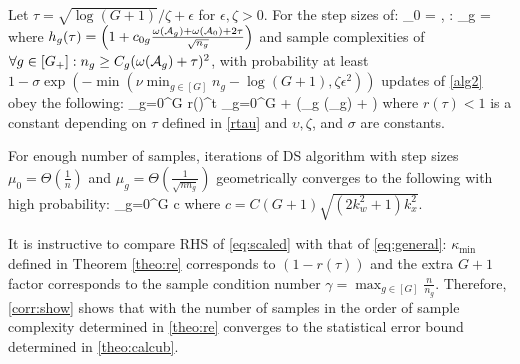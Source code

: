 \begin{theorem}
	\label{theo:step}		
	Let $\tau = \sqrt{\log(G+1)}/\zeta + \epsilon$ for $\epsilon, \zeta > 0$. For the step sizes of:
	\be
	\nr
	\mu_0 =  ,
	\forall \in [G]: \mu_g =   
	\ee
	where $h_g(\tau) = \left(1 + c_{0g} \frac{\omega(\cA_g) + \omega(\cA_0) + 2\tau}{\sqrt{n_g}}\right)$
	and sample complexities of $\forall g \in [G_+]: n_g \geq C_g (\omega(\cA_g) + \tau)^2$,
	with probability at least $ 1 - \sigma \exp(- \min(\nu \min_{g \in [G]} n_g - \log(G+1), \zeta \epsilon^2) )$ updates of \cref{alg2} obey the following:	
	\be
	\nr
	\sum_{g=0}^{G}  
	\leq r(\tau)^t \sum_{g=0}^{G}     
	+  \left(\max_{g \in [G_+]} \omega(\cA_g) + \tau \right)
	\ee
	where $r(\tau) < 1$ is a constant depending on $\tau$ defined in \eqref{rtau} and $\upsilon, \zeta$, and $\sigma$ are constants.
	
\end{theorem}

\begin{corollary}
	\label{corr:show}
	For enough number of samples, iterations of DS algorithm with step sizes $\mu_0 = \Theta(\frac{1}{n})$ and $\mu_g =  \Theta(\frac{1}{\sqrt{n n_g}})$ geometrically converges to the following with high probability:
	{\small\beq
	\label{eq:scaled}
	\sum_{g=0}^{G}  
	\leq c 
	\eeq}
	where $c = C(G+1)\sqrt{(2k_w^2 + 1)k_x^2}$. 
\end{corollary}
	It is instructive to compare RHS of \cref{eq:scaled} with that of \cref{eq:general}: $\kappa_{\min}$ defined in Theorem \cref{theo:re} corresponds to $(1 - r(\tau))$ %
	and the extra $G+1$ factor corresponds to the sample condition number $\gamma = \max_{g \in [G] } \frac{n}{n_g}$.
	Therefore, \cref{corr:show} shows that with the number of samples in the order of sample complexity determined in \cref{theo:re} \dc{} converges to the statistical error bound determined in \cref{theo:calcub}.
	
